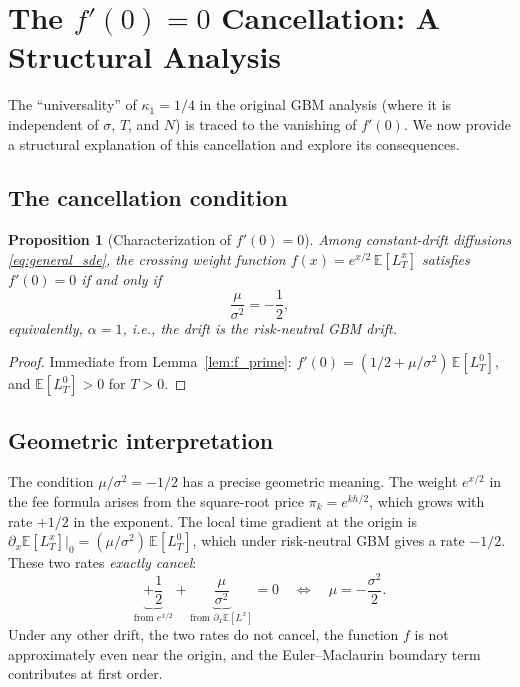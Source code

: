 \documentclass[11pt]{article}
\newtheorem{proposition}[theorem]{Proposition}
\theoremstyle{definition}
\theoremstyle{remark}
\newcommand{\E}{\mathbb{E}}
\begin{document}
\section{The $f'(0) = 0$ Cancellation: A Structural Analysis}
\label{sec:cancellation}

The ``universality'' of $\kappa_1 = 1/4$ in the original
GBM analysis (where it is independent of $\sigma$, $T$, and $N$) is
traced to the vanishing of $f'(0)$. We now provide a structural
explanation of this cancellation and explore its consequences.

\subsection{The cancellation condition}

\begin{proposition}[Characterization of $f'(0) = 0$]
\label{prop:cancellation}
Among constant-drift diffusions \eqref{eq:general_sde}, the crossing
weight function $f(x) = e^{x/2}\,\E[L^x_T]$ satisfies $f'(0) = 0$
if and only if
\begin{equation}\label{eq:cancel_condition}
\frac{\mu}{\sigma^2} = -\frac{1}{2},
\end{equation}
equivalently, $\alpha = 1$, i.e., the drift is the risk-neutral GBM
drift.
\end{proposition}
\begin{proof}
Immediate from Lemma~\ref{lem:f_prime}: $f'(0) = (1/2 + \mu/\sigma^2)
\,\E[L^0_T]$, and $\E[L^0_T] > 0$ for $T > 0$.
\end{proof}

\subsection{Geometric interpretation}

The condition $\mu/\sigma^2 = -1/2$ has a precise geometric meaning.
The weight $e^{x/2}$ in the fee formula arises from the square-root
price $\pi_k = e^{kh/2}$, which grows with rate $+1/2$ in the
exponent. The local time gradient at the origin is
$\partial_x\E[L^x_T]\big|_0 = (\mu/\sigma^2)\,\E[L^0_T]$, which
under risk-neutral GBM gives a rate $-1/2$. These two rates
\emph{exactly cancel}:
\begin{equation}\label{eq:rate_cancel}
\underbrace{+\frac{1}{2}}_{\text{from } e^{x/2}}
+ \underbrace{\frac{\mu}{\sigma^2}}_{\text{from }
\partial_x\E[L^x]} = 0
\quad \iff \quad \mu = -\frac{\sigma^2}{2}.
\end{equation}
Under any other drift, the two rates do not cancel, the function $f$
is not approximately even near the origin, and the Euler--Maclaurin
boundary term contributes at first order.
\end{document}

